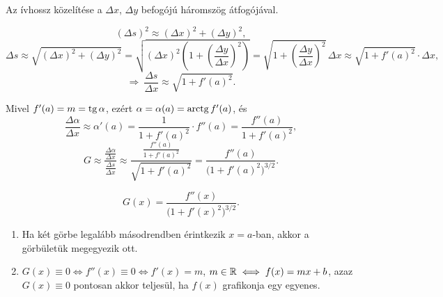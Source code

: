 \documentclass[11pt]{article}
\begin{document}
\begin{notefig}{Az ívhossz közelítése a $\Delta x$, $\Delta y$ befogójú háromszög átfogójával.}
\end{notefig}

\[
(\Delta s)^{2}\approx(\Delta x)^{2}+(\Delta y)^{2},
\]
\[
\Delta s\approx\sqrt{(\Delta x)^{2}+(\Delta y)^{2}}=\sqrt{(\Delta x)^{2}\left(1+\left(\frac{\Delta y}{\Delta x}\right)^{2}\right)}
=\sqrt{1+\left(\frac{\Delta y}{\Delta x}\right)^{2}}\,\Delta x\approx\sqrt{1+f'(a)^{2}}\cdot\Delta x,
\]
\[
\Longrightarrow\ \frac{\Delta s}{\Delta x}\approx\sqrt{1+f'(a)^{2}}.
\]

\noindent Mivel $f'(a)=m=\operatorname{tg}\alpha$, ezért $\alpha=\alpha(a)=\operatorname{arctg} f'(a)$, és
\[
\frac{\Delta\alpha}{\Delta x}\approx\alpha'(a)=\frac{1}{1+f'(a)^{2}}\cdot f''(a)=\frac{f''(a)}{1+f'(a)^{2}},
\]
\[
G\approx\frac{\frac{\Delta\alpha}{\Delta x}}{\frac{\Delta s}{\Delta x}}\approx\frac{\frac{f''(a)}{1+f'(a)^{2}}}{\sqrt{1+f'(a)^{2}}}=\frac{f''(a)}{\bigl(1+f'(a)^{2}\bigr)^{3/2}}.
\]

\begin{thmbox}
\begin{proposition}
\begin{equation}\label{eq:gorbulet}
G(x)=\frac{f''(x)}{\bigl(1+f'(x)^{2}\bigr)^{3/2}}.
\end{equation}
\end{proposition}
\end{thmbox}

\begin{remark}\leavevmode
\begin{enumerate}[label=\arabic*.]
\item Ha két görbe legalább másodrendben érintkezik $x=a$-ban, akkor a görbületük megegyezik ott.
\item $G(x)\equiv 0\iff f''(x)\equiv 0\iff f'(x)=m$, $m\in\mathbb{R}\iff f(x)=mx+b$, azaz $G(x)\equiv 0$ pontosan akkor teljesül, ha $f(x)$ grafikonja egy egyenes.
\end{enumerate}
\end{remark}
\end{document}
